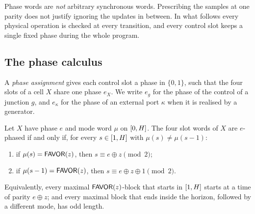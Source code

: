 \begin{remark}\label{rem:notarbitrary}
Phase words are \emph{not} arbitrary synchronous words. Prescribing the samples at one parity does
not justify ignoring the updates in between. In what follows every physical operation is checked at
every transition, and every control slot keeps a single fixed phase during the whole program.
\end{remark}

\subsection{The phase calculus}\label{sec:phasecalc}

A \emph{phase assignment} gives each control slot a phase in $\{0,1\}$, such that the four slots of
a cell $X$ share one phase $e_X$. We write $e_g$ for the phase of the control of a junction $g$, and
$e_\kappa$ for the phase of an external port $\kappa$ when it is realised by a generator.

\begin{lemma}\label{lem:cellphase}
Let $X$ have phase $e$ and mode word $\mu$ on $[0,H]$. The four slot words of $X$ are $e$-phased if
and only if, for every $s\in[1,H]$ with $\mu(s)\ne\mu(s-1)$:
\begin{enumerate}[label=(\alph*)]
\item if $\mu(s)=\textsf{FAVOR}(z)$, then $s\equiv e\oplus z\pmod 2$;
\item if $\mu(s-1)=\textsf{FAVOR}(z)$, then $s\equiv e\oplus z\oplus 1\pmod 2$.
\end{enumerate}
Equivalently, every maximal $\textsf{FAVOR}(z)$-block that starts in $[1,H]$ starts at a time of parity
$e\oplus z$; and every maximal block that ends inside the horizon, followed by a different mode, has
odd length.
\end{lemma}

